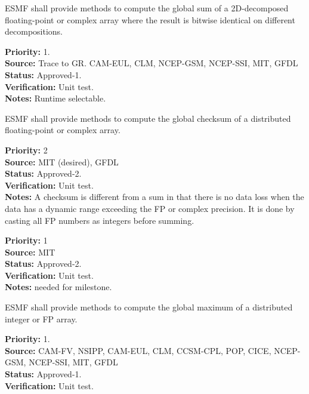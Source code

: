 
ESMF shall provide methods to compute the global sum of a
2D-decomposed floating-point or complex array where the result is
bitwise identical on different decompositions.

\begin{reqlist}
{\bf Priority:} 1. \\ 
{\bf Source:} Trace to GR. CAM-EUL, CLM, NCEP-GSM, NCEP-SSI, MIT, GFDL \\
{\bf Status:} Approved-1. \\
{\bf Verification:} Unit test. \\
{\bf Notes:} Runtime selectable.
\end{reqlist}


ESMF shall provide methods to compute the global checksum of a
distributed floating-point or complex array. 

\begin{reqlist}
{\bf Priority:} 2 \\
{\bf Source:} MIT (desired), GFDL \\
{\bf Status:} Approved-2. \\
{\bf Verification:} Unit test. \\
{\bf Notes:} A checksum is different from a sum in that there is no
  data loss when the data has a dynamic range exceeding the FP or
  complex precision. It is done by casting all FP numbers as integers
  before summing.
\end{reqlist}


\begin{reqlist}
{\bf Priority:} 1 \\
{\bf Source:} MIT \\
{\bf Status:} Approved-2. \\
{\bf Verification:} Unit test. \\
{\bf Notes:} needed for milestone.
\end{reqlist}


ESMF shall provide methods to compute the global maximum of a
distributed integer or FP array.

\begin{reqlist}
{\bf Priority:} 1. \\ 
{\bf Source:} CAM-FV, NSIPP, CAM-EUL, CLM, CCSM-CPL, POP, CICE, NCEP-GSM, NCEP-SSI, MIT, GFDL \\
{\bf Status:} Approved-1. \\
{\bf Verification:} Unit test. 
\end{reqlist}


